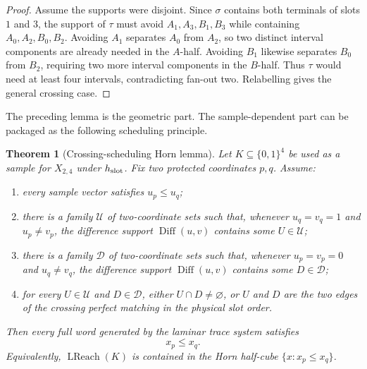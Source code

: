 \documentclass[11pt]{article}
\newtheorem{theorem}[definition]{Theorem}
\begin{document}
\begin{proof}
Assume the supports were disjoint.  Since $\sigma$ contains both terminals of
slots $1$ and $3$, the support of $\tau$ must avoid
$A_1,A_3,B_1,B_3$ while containing
$A_0,A_2,B_0,B_2$.  Avoiding $A_1$ separates $A_0$ from $A_2$, so two distinct
interval components are already needed in the $A$-half.  Avoiding $B_1$
likewise separates $B_0$ from $B_2$, requiring two more interval components in
the $B$-half.  Thus $\tau$ would need at least four intervals, contradicting
fan-out two.  Relabelling gives the general crossing case.
\end{proof}

The preceding lemma is the geometric part.  The sample-dependent part can be
packaged as the following scheduling principle.

\begin{theorem}[Crossing-scheduling Horn lemma]
\label{thm:crossing-scheduling-horn}
Let $K\subseteq\{0,1\}^4$ be used as a sample for $X_{2,4}$ under
$h_{\rm slot}$.  Fix two protected coordinates $p,q$.  Assume:
\begin{enumerate}[label=\textup{(H\arabic*)},leftmargin=*]
\item every sample vector satisfies $u_p\le u_q$;
\item there is a family $\mathcal U$ of two-coordinate sets such that, whenever
      $u_q=v_q=1$ and $u_p\ne v_p$, the difference support
      $\operatorname{Diff}(u,v)$ contains some $U\in\mathcal U$;
\item there is a family $\mathcal D$ of two-coordinate sets such that, whenever
      $u_p=v_p=0$ and $u_q\ne v_q$, the difference support
      $\operatorname{Diff}(u,v)$ contains some $D\in\mathcal D$;
\item for every $U\in\mathcal U$ and $D\in\mathcal D$, either
      $U\cap D\ne\varnothing$, or $U$ and $D$ are the two edges of the crossing
      perfect matching in the physical slot order.
\end{enumerate}
Then every full word generated by the laminar trace system satisfies
\[
  \boxed{x_p\le x_q.}
\]
Equivalently, $\operatorname{LReach}(K)$ is contained in the Horn half-cube
$\{x:x_p\le x_q\}$.
\end{theorem}
\end{document}
